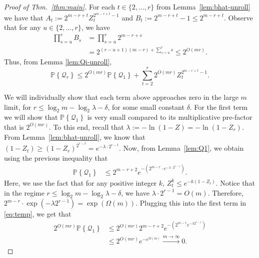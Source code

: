 \documentclass[conference,letterpaper]{IEEEtran}
\newcommand{\cQ}{\ensuremath{\mathcal{Q}}}
\newcommand{\PR}[1]{{\mathbb{P}}\left\{ #1\right\}}
\begin{document}
\begin{proof}[Proof of Thm.~\ref{thm:main}]
    For each $ t \in  \{ 2 , \ldots, r \}$ from Lemma~\ref{lem:bhat-unroll} we have that $A_t := 2^{m-r+t}  Z_t^{2^{m-r+t}-1}$ and $B_t := 2^{m-r+t}-1 \leq 2^{m-r+t}.$
    Observe that for any $u\in \{2,\ldots,r\}$, we have
    \begin{align*}
       \prod_{s=u}^r B_s &=  \prod_{s=u}^r 2^{m-r+s} \\&=2^{(r-u+1)(m-r)+\sum_{s=u}^r s}
\leq 2^{O(mr)}.
    \end{align*}
Thus, from Lemma \ref{lem:Qi-unroll},
\begin{equation}
\label{eq:temp}
    \PR{\cQ_r}
\leq 2^{O(mr)} \PR{ \cQ_1} + \sum_{t=2 }^r 2^{ O(mr)} Z_t^{2^{m-r+t}-1}.
\end{equation}

We will individually show that each term above approaches zero in the large $m$ limit, for $r \le \log_2 m -\log_2 \lambda-\delta$, for some small constant $\delta$. For the first term we will show that $\PR{\cQ_1}$ is very small compared to its multiplicative pre-factor that is $2^{ O(mr)}$. To this end, recall that $ \lambda := -\ln( 1- Z) = -\ln( 1- Z_r)$. From Lemma~\ref{lem:bhat-unroll}, we know that
$
    ( 1 - Z_t ) \geq ( 1 - Z_r)^{2^{r-t}} = e^{-\lambda \cdot 2^{r-t}}.
$
Now, from Lemma~\ref{lem:Q1}, we obtain using the previous inequality that
\begin{equation*}\label{eq:asym-Q1}
\begin{aligned}
        \PR{ \cQ_1} %
       & \leq  2^{m-r+2} e^{-(2^{m-r}\cdot  e^{  -\lambda\cdot 2^{r-1}})}.
       \end{aligned}
\end{equation*} 
Here, we use the fact that for any positive integer $k$, $ Z_t^{k} \leq e^{ -k ( 1- Z_t)  } $. Notice that in the regime $r \le \log_2 m -\log_2 \lambda -\delta$, we have $ \lambda\cdot 2^{r-1} = O(m)$. Therefore,
$
      2^{m-r}\cdot\exp(-\lambda 2^{r-1})=\exp(\Omega(m)).
$
Plugging this into the first term in \eqref{eq:temp}, we get that
\begin{equation*}
    \begin{aligned}
        2^{O(mr)} \PR{ \cQ_1}  &\leq 2^{O(mr)}  2^{m-r+2} e^{-(2^{m-r}  e^{  -\lambda 2^{r-1}})}\\
        & \leq 2^{O(mr)} e^{-e^{\Omega (m) }}\xrightarrow{m\to \infty} 0.
    \end{aligned}
\end{equation*}


\end{proof}
\end{document}
